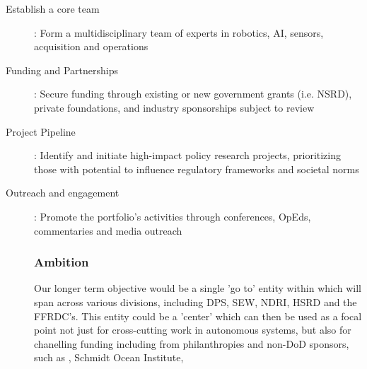 \documentclass[10pt,letterpaper]{article}
\begin{document}
\begin{description}

\item[Establish a core team]: Form a multidisciplinary team of \org
  experts in robotics, AI, sensors, acquisition and operations

\item[Funding and Partnerships]: Secure funding through existing or
  new government grants (i.e. NSRD), private foundations, and industry
  sponsorships subject to review

\item[Project Pipeline]: Identify and initiate high-impact policy
  research projects, prioritizing those with potential to influence
  regulatory frameworks and societal norms
  
\item[Outreach and engagement]: Promote the portfolio’s activities
  through conferences, OpEds, commentaries and media outreach


\subsubsection{Ambition}

Our longer term objective would be a single 'go to' entity within \org
which will span across various divisions, including DPS, SEW, NDRI,
HSRD and the FFRDC's. This entity could be a 'center' which can then
be used as a focal point not just for cross-cutting work in autonomous
systems, but also for chanelling funding including from philanthropies
and non-DoD sponsors, such as \noae, Schmidt Ocean Institute, 

\end{description}
\end{document}
